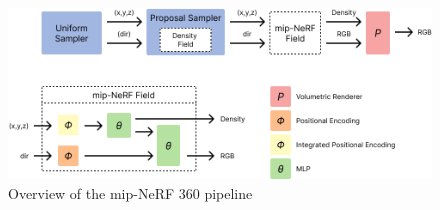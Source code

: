 \begin{figure}[!h]
    \centering
    \includegraphics[width=1.0\textwidth]{figures/mip-nerf-360-pipeline-overview.png}
    \caption{Overview of the mip-NeRF 360 pipeline}
    \label{fig:mip-nerf-360-pipeline-overview}
\end{figure}